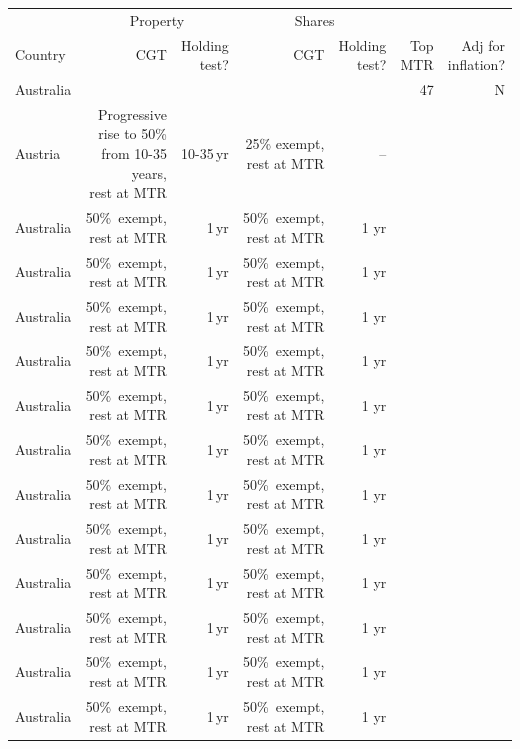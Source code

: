 \documentclass{grattan}\usepackage[]{graphicx}\usepackage[]{color}
\begin{document}
\newcommand{\cella}[1]{{\cellcolor{Color2}\makecell[tr]{#1}}}
\newcommand{\cellb}[1]{{\cellcolor{Color3}\makecell[tr]{#1}}}
\newcommand{\cellc}[1]{\cellcolor{Color4}\makecell[tr]{#1}}
\newcommand{\celld}[1]{\cellcolor{Color5}\makecell[tr]{#1}}

\renewcommand{\arraystretch}{1.2}
\begin{longtable}{lrrrrrr}
\toprule
 & \multicolumn{2}{c}{Property} & \multicolumn{2}{c}{Shares} &  & \\
 \cmidrule(lr){2-3}\cmidrule(lr){4-5} 
 Country & CGT & Holding test? & CGT & Holding test? & Top MTR & Adj for inflation? \\ 
 \midrule
 \endhead
 \bottomrule
 \endfoot
 Australia & \cellcolor{Color3}{50\%\ exempt, rest at MTR} & \cellcolor{Color3}{1\,yr} & \cellcolor{Color3}{50\%\ exempt, rest at MTR} & \cellb{1\,yr} & 47 & N\\ 
 Austria   & \cellc{Progressive rise to 50\% from 10-35 years,\\ rest at MTR} & \cellcolor{Color4}10-35\,yr & \cellcolor{Color4} 25\% exempt, rest at MTR & -- & \cellcolor{Color3}{50} & \cellcolor{Color3}{N} \\ 
 Australia & 50\%\ exempt, rest at MTR & 1\,yr & 50\%\ exempt, rest at MTR & 1 yr \\ 
 Australia & 50\%\ exempt, rest at MTR & 1\,yr & 50\%\ exempt, rest at MTR & 1 yr \\ 
 Australia & 50\%\ exempt, rest at MTR & 1\,yr & 50\%\ exempt, rest at MTR & 1 yr \\ 
 Australia & 50\%\ exempt, rest at MTR & 1\,yr & 50\%\ exempt, rest at MTR & 1 yr \\ 
 Australia & 50\%\ exempt, rest at MTR & 1\,yr & 50\%\ exempt, rest at MTR & 1 yr \\ 
 Australia & 50\%\ exempt, rest at MTR & 1\,yr & 50\%\ exempt, rest at MTR & 1 yr \\ 
 Australia & 50\%\ exempt, rest at MTR & 1\,yr & 50\%\ exempt, rest at MTR & 1 yr \\ 
 Australia & 50\%\ exempt, rest at MTR & 1\,yr & 50\%\ exempt, rest at MTR & 1 yr \\ 
 Australia & 50\%\ exempt, rest at MTR & 1\,yr & 50\%\ exempt, rest at MTR & 1 yr \\ 
 Australia & 50\%\ exempt, rest at MTR & 1\,yr & 50\%\ exempt, rest at MTR & 1 yr \\ 
 Australia & 50\%\ exempt, rest at MTR & 1\,yr & 50\%\ exempt, rest at MTR & 1 yr \\ 
 Australia & 50\%\ exempt, rest at MTR & 1\,yr & 50\%\ exempt, rest at MTR & 1 yr \\ 

\end{longtable}
\end{document}

